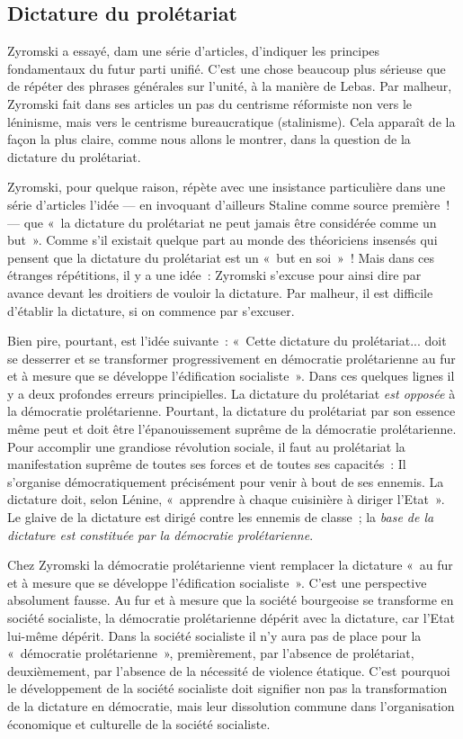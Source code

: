 \documentclass[french,twoside]{book} %
\begin{document}
 \subsection[{Dictature du prolétariat}]{Dictature du prolétariat}
\noindent Zyromski a essayé, dam une série d’articles, d’indiquer les principes fondamentaux du futur parti unifié. C’est une chose beaucoup plus sérieuse que de répéter des phrases générales sur l’unité, à la manière de Lebas. Par malheur, Zyromski fait dans ses articles un pas du centrisme réformiste non vers le léninisme, mais vers le centrisme bureaucratique (stalinisme). Cela apparaît de la façon la plus claire, comme nous allons le montrer, dans la question de la dictature du prolétariat.\par
Zyromski, pour quelque raison, répète avec une insistance particulière dans une série d’articles l’idée — en invoquant d’ailleurs Staline comme source première ! — que « la dictature du prolétariat ne peut jamais être considérée comme un but ». Comme s’il existait quelque part au monde des théoriciens insensés qui pensent que la dictature du prolétariat est un « but en soi » ! Mais dans ces étranges répétitions, il y a une idée : Zyromski s’excuse pour ainsi dire par avance devant les droitiers de vouloir la dictature. Par malheur, il est difficile d’établir la dictature, si on commence par s’excuser.\par
Bien pire, pourtant, est l’idée suivante : « Cette dictature du prolétariat... doit se desserrer et se transformer progressivement en démocratie prolétarienne au fur et à mesure que se développe l’édification socialiste ». Dans ces quelques lignes il y a deux profondes erreurs principielles. La dictature du prolétariat \emph{est opposée} à la démocratie prolétarienne. Pourtant, la dictature du prolétariat par son essence même peut et doit être l’épanouissement suprême de la démocratie prolétarienne. Pour accomplir une grandiose révolution sociale, il faut au prolétariat la manifestation suprême de toutes ses forces et de toutes ses capacités : Il s’organise démocratiquement précisément pour venir à bout de ses ennemis. La dictature  doit, selon Lénine, « apprendre à chaque cuisinière à diriger l’Etat ». Le glaive de la dictature est dirigé contre les ennemis de classe ; la \emph{base de la dictature est constituée par la démocratie prolétarienne}.\par
Chez Zyromski la démocratie prolétarienne vient remplacer la dictature « au fur et à mesure que se développe l’édification socialiste ». C’est une perspective absolument fausse. Au fur et à mesure que la société bourgeoise se transforme en société socialiste, la démocratie prolétarienne dépérit avec la dictature, car l’Etat lui-même dépérit. Dans la société socialiste il n’y aura pas de place pour la « démocratie prolétarienne », premièrement, par l’absence de prolétariat, deuxièmement, par l’absence de la nécessité de violence étatique. C’est pourquoi le développement de la société socialiste doit signifier non pas la transformation de la dictature en démocratie, mais leur dissolution commune dans l’organisation économique et culturelle de la société socialiste.
\end{document}
